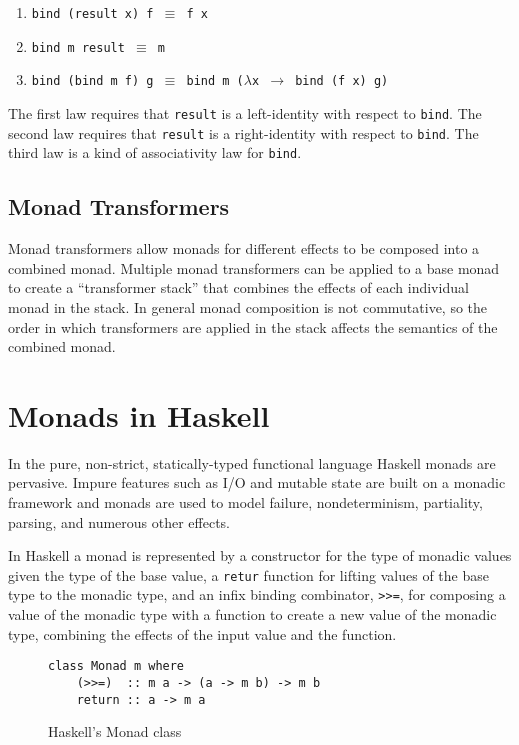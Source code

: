 \documentclass[natbib,10pt]{sigplanconf}
\begin{document}
\begin{enumerate}
\item {\tt bind (result x) f $\equiv$ f x}
\item {\tt bind m result $\equiv$ m}
\item {\tt bind (bind m f) g $\equiv$ bind m ($\lambda$x $\rightarrow$ bind (f x) g)}
\end{enumerate}

The first law requires that {\tt result} is a left-identity with
respect to {\tt bind}. The second law requires that {\tt result} is a
right-identity with respect to {\tt bind}. The third law is a kind of
associativity law for {\tt bind}.

\subsection{Monad Transformers}

Monad transformers allow monads for different effects to be composed
into a combined monad.  Multiple monad transformers can be applied to
a base monad to create a ``transformer stack'' that combines the
effects of each individual monad in the stack.  In general monad
composition is not commutative, so the order in which transformers are
applied in the stack affects the semantics of the combined monad.

\section{Monads in Haskell}

In the pure, non-strict, statically-typed functional language Haskell
monads are pervasive.  Impure features such as I/O and mutable state
are built on a monadic framework and monads are used to model failure,
nondeterminism, partiality, parsing, and numerous other effects.

In Haskell a monad is represented by a constructor for the type of
monadic values given the type of the base value, a {\tt retur}
function for lifting values of the base type to the monadic type, and
an infix binding combinator, {\tt >>=}, for composing a value of the
monadic type with a function to create a new value of the monadic
type, combining the effects of the input value and the function.

\begin{figure}
\begin{center}
\begin{verbatim}
class Monad m where
    (>>=)  :: m a -> (a -> m b) -> m b
    return :: a -> m a
\end{verbatim}
\end{center}
\caption{Haskell's Monad class}
\label{fig-Haskell-Monad-class}
\end{figure}
\end{document}
